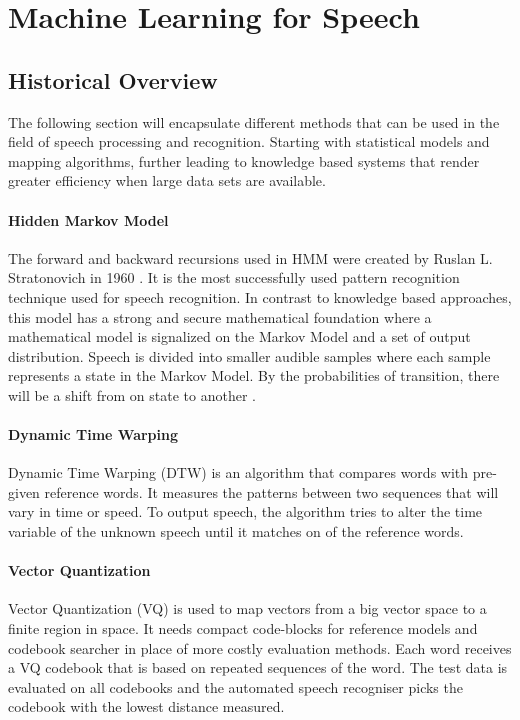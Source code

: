 \chapter{Machine Learning for Speech}\label{ch:machine_learning}

\section{Historical Overview}
The following section will encapsulate different methods that 
can be used in the field of speech processing and recognition.
Starting with statistical models and mapping algorithms,
further leading to knowledge based systems that render greater
efficiency when large data sets are available.

\subsubsection{Hidden Markov Model}

The forward and backward recursions used in HMM  were created by
Ruslan L. Stratonovich in 1960
\cite{stratonovich1960conditional}.
It is the most successfully used pattern recognition technique
used for speech recognition.
In contrast to knowledge based approaches,
this model has a strong and secure mathematical foundation
where a mathematical model is signalized on the Markov Model
and a set of output distribution. Speech is divided into
smaller audible samples where each sample represents a state
in the Markov Model. By the probabilities of transition,
there will be a shift from on state to another
\cite[p.~2]{gaikwad2010review}\cite{togneri1990speech}.

\subsubsection{Dynamic Time Warping}

Dynamic Time Warping (DTW) is an algorithm that compares words with pre-given reference words.
 It measures the patterns between two sequences that will vary in time or speed.\cite{togneri1990speech}
 To output speech, the algorithm tries to alter the time variable of the unknown speech until it matches on of the reference words.

\subsubsection{Vector Quantization}

Vector Quantization (VQ) is used to map vectors from a big vector space to a finite region in space. It needs compact code-blocks for reference models and codebook searcher in place of more costly evaluation methods. Each word receives a VQ codebook that is based on repeated sequences of the word. The test data is evaluated on all codebooks and the automated speech recogniser picks the codebook with the lowest distance measured.\cite[p.~20-21]{togneri1990speech}


